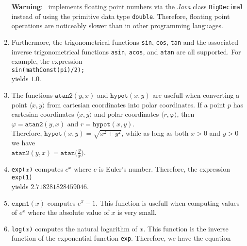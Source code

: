\begin{enumerate}
      \textbf{Warning}:  \setlx\ implements floating point numbers via the \textsl{Java}
      class \texttt{BigDecimal} instead of using the primitive data type \texttt{double}.
      Therefore, floating point operations are noticeably slower than in other
      programming languages.
\item Furthermore, the trigonometrical functions \texttt{sin}, \texttt{cos}, \texttt{tan}
      and the associated inverse trigonometrical functions 
      \texttt{asin}, 
      \texttt{acos}, and 
      \texttt{atan}
      are all supported.  For example, the expression
      \\[0.2cm]
      \hspace*{1.3cm}
      \texttt{sin(mathConst(pi)/2);}
      \\[0.2cm]
      yields $1.0$.
\item The functions $\texttt{atan2}(y,x)$ and $\texttt{hypot}(x,y)$ are usefull when converting 
      a point $\langle x, y \rangle$ from cartesian coordinates into polar coordinates.  If a
      point $p$ has cartesian coordinates $\langle x, y \rangle$ and polar coordinates 
      $\langle r, \varphi \rangle$, then 
      \\[0.2cm]
      \hspace*{1.3cm}
      $\varphi = \mathtt{atan2}(y,x)$ \quad and \quad $r = \mathtt{hypot}(x, y)$.
      \\[0.2cm]
      Therefore, $\texttt{hypot}(x,y) = \sqrt{x^2 + y^2}$, while as long as both $x > 0$ and $y > 0$
      we have
      \\[0.2cm]
      \hspace*{1.3cm}
      $\mathtt{atan2}(y,x) = \mathtt{atan}\bigl(\frac{y}{x}\bigr)$.
\item \texttt{exp($x$)} computes $e^x$ where $e$ is Euler's number.  Therefore, the
      expression 
      \\[0.2cm]
      \hspace*{1.3cm}
      \texttt{exp(1)}
      \\[0.2cm]
      yields $2.718281828459046$.
\item $\texttt{expm1}(x)$ computes $e^x - 1$.  This function is usefull when computing values of
      $e^x$ where the absolute value of $x$ is very small.
\item \texttt{log($x$)} computes the natural logarithm of $x$.  This function is the
      inverse function of the exponential function \texttt{exp}.  Therefore, we have
      the equation
      \\[0.2cm]

\end{enumerate}
